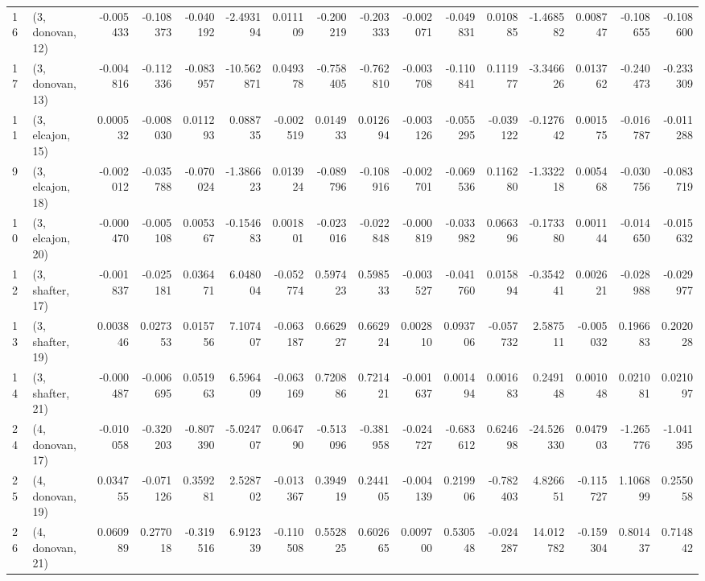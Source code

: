 \begin{tabular}{llrrrrrrrrrrrrrr}
16 &  (3, donovan, 12) &  -0.005433 & -0.108373 & -0.040192 &  -2.493194 &  0.011109 &  -0.200219 & -0.203333 & -0.002071 & -0.049831 &  0.010885 &  -1.468582 &  0.008747 & -0.108655 & -0.108600 \\
17 &  (3, donovan, 13) &  -0.004816 & -0.112336 & -0.083957 & -10.562871 &  0.049378 &  -0.758405 & -0.762810 & -0.003708 & -0.110841 &  0.111977 &  -3.346626 &  0.013762 & -0.240473 & -0.233309 \\
11 &  (3, elcajon, 15) &   0.000532 & -0.008030 &  0.011293 &   0.088735 & -0.002519 &   0.014933 &  0.012694 & -0.003126 & -0.055295 & -0.039122 &  -0.127642 &  0.001575 & -0.016787 & -0.011288 \\
9  &  (3, elcajon, 18) &  -0.002012 & -0.035788 & -0.070024 &  -1.386623 &  0.013924 &  -0.089796 & -0.108916 & -0.002701 & -0.069536 &  0.116280 &  -1.332218 &  0.005468 & -0.030756 & -0.083719 \\
10 &  (3, elcajon, 20) &  -0.000470 & -0.005108 &  0.005367 &  -0.154683 &  0.001801 &  -0.023016 & -0.022848 & -0.000819 & -0.033982 &  0.066396 &  -0.173380 &  0.001144 & -0.014650 & -0.015632 \\
12 &  (3, shafter, 17) &  -0.001837 & -0.025181 &  0.036471 &   6.048004 & -0.052774 &   0.597423 &  0.598533 & -0.003527 & -0.041760 &  0.015894 &  -0.354241 &  0.002621 & -0.028988 & -0.029977 \\
13 &  (3, shafter, 19) &   0.003846 &  0.027353 &  0.015756 &   7.107407 & -0.063187 &   0.662927 &  0.662924 &  0.002810 &  0.093706 & -0.057732 &   2.587511 & -0.005032 &  0.196683 &  0.202028 \\
14 &  (3, shafter, 21) &  -0.000487 & -0.006695 &  0.051963 &   6.596409 & -0.063169 &   0.720886 &  0.721421 & -0.001637 &  0.001494 &  0.001683 &   0.249148 &  0.001048 &  0.021081 &  0.021097 \\
24 &  (4, donovan, 17) &  -0.010058 & -0.320203 & -0.807390 &  -5.024707 &  0.064790 &  -0.513096 & -0.381958 & -0.024727 & -0.683612 &  0.624698 & -24.526330 &  0.047903 & -1.265776 & -1.041395 \\
25 &  (4, donovan, 19) &   0.034755 & -0.071126 &  0.359281 &   2.528702 & -0.013367 &   0.394919 &  0.244105 & -0.004139 &  0.219906 & -0.782403 &   4.826651 & -0.115727 &  1.106899 &  0.255058 \\
26 &  (4, donovan, 21) &   0.060989 &  0.277018 & -0.319516 &   6.912339 & -0.110508 &   0.552825 &  0.602665 &  0.009700 &  0.530548 & -0.024287 &  14.012782 & -0.159304 &  0.801437 &  0.714842 \\

\end{tabular}
